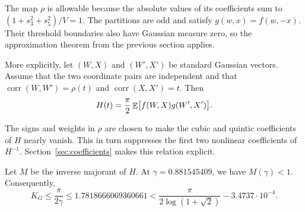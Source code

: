 The map \(\rho\) is allowable because the absolute values of its
coefficients sum to \((1+s_3^2+s_5^2)/V=1\). The partitions are odd and
satisfy \(g(w,x)=f(w,-x)\). Their threshold boundaries also have Gaussian
measure zero, so the approximation theorem from the previous section
applies.

More explicitly, let \((W,X)\) and \((W',X')\) be standard Gaussian vectors.
Assume that the two coordinate pairs are independent and that
\(\operatorname{corr}(W,W')=\rho(t)\) and
\(\operatorname{corr}(X,X')=t\). Then
\begin{equation}
    H(t)
    =
    \frac{\pi}{2}
    \mathop{\mathbb{E}}\bigl[f(W,X)g(W',X')\bigr].
    \label{eq:lim-H}
\end{equation}

The signs and weights in \(\rho\) are chosen to make the cubic and quintic
coefficients of \(H\) nearly vanish. This in turn suppresses the first two
nonlinear coefficients of \(H^{-1}\). Section~\ref{sec:coefficients} makes
this relation explicit.

\begin{theorem}
\label{thm:cubic-quintic-upper-bound}
Let \(M\) be the inverse majorant of \(H\). At
\(\gamma=0.881545409\), we have \(M(\gamma)<1\). Consequently,
\[
    K_G
    \leq
    \frac{\pi}{2\gamma}
    \leq
    1.7818666069360661
    <
    \frac{\pi}{2\log(1+\sqrt{2})}
    -
    3.4737\cdot 10^{-4}.
\]
\end{theorem}